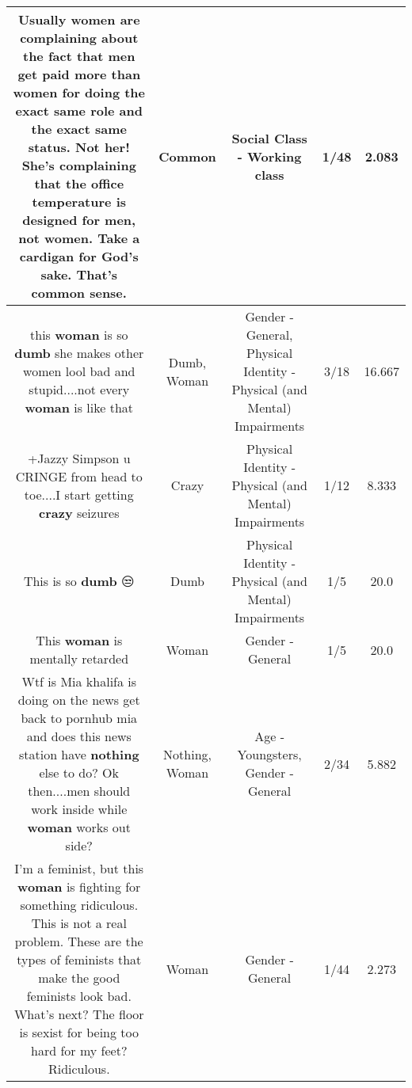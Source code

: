 \documentclass[11pt]{article}
\newlength\mylength
\begin{document}
\begin{center}
\begin{longtable}{|C{.65\mylength}|C{.30\mylength}|C{.12\mylength}|C{.12\mylength}|C{.12\mylength}|}
  \small Usually women are complaining about the fact that men get paid more than women for doing the exact same role and the exact same status. Not her! She's complaining that the office temperature is designed for men, not women. Take a cardigan for God's sake. That's \textbf{common} sense.\normalsize   & Common & Social Class - Working class & 1/48 & 2.083 \\  \hline
  \small this \textbf{woman} is so \textbf{dumb} she makes other women lool bad and stupid....not every \textbf{woman} is like that\normalsize   & Dumb, Woman & Gender - General, Physical Identity - Physical (and Mental) Impairments & 3/18 & 16.667 \\  \hline
  \small +Jazzy Simpson u CRINGE from head to toe....I start getting \textbf{crazy} seizures\normalsize   & Crazy & Physical Identity - Physical (and Mental) Impairments & 1/12 & 8.333 \\  \hline
  \small This is so \textbf{dumb} 😒\normalsize   & Dumb & Physical Identity - Physical (and Mental) Impairments & 1/5 & 20.0 \\  \hline
  \small This \textbf{woman} is mentally retarded\normalsize   & Woman & Gender - General & 1/5 & 20.0 \\  \hline
  \small Wtf is Mia khalifa is doing on the news get back to pornhub mia and does this news station have \textbf{nothing} else to do? Ok then....men should work inside while \textbf{woman} works out side?\normalsize   & Nothing, Woman & Age - Youngsters, Gender - General & 2/34 & 5.882 \\  \hline
  \small I'm a feminist, but this \textbf{woman} is fighting for something ridiculous. This is not a real problem. These are the types of feminists that make the good feminists look bad. What's next? The floor is sexist for being too hard for my feet? Ridiculous.\normalsize   & Woman & Gender - General & 1/44 & 2.273 \\  \hline

\end{longtable}
\end{center}
\end{document}
